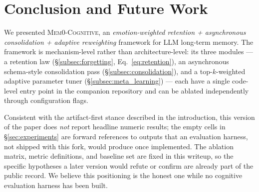 \section{Conclusion and Future Work}
\label{sec:conclusion}

We presented \textsc{Mem0-Cognitive}, an \emph{emotion-weighted retention + asynchronous consolidation + adaptive reweighting} framework for LLM long-term memory. The framework is mechanism-level rather than architecture-level: its three modules --- a retention law (\S\ref{subsec:forgetting}, Eq.~\ref{eq:retention}), an asynchronous schema-style consolidation pass (\S\ref{subsec:consolidation}), and a top-$k$-weighted adaptive parameter tuner (\S\ref{subsec:meta_learning}) --- each have a single code-level entry point in the companion repository and can be ablated independently through configuration flags.

Consistent with the artifact-first stance described in the introduction, this version of the paper does \emph{not} report headline numeric results; the empty cells in \S\ref{sec:experiments} are forward references to outputs that an evaluation harness, not shipped with this fork, would produce once implemented. The ablation matrix, metric definitions, and baseline set are fixed in this writeup, so the specific hypotheses a later version would refute or confirm are already part of the public record. We believe this positioning is the honest one while no cognitive evaluation harness has been built.

